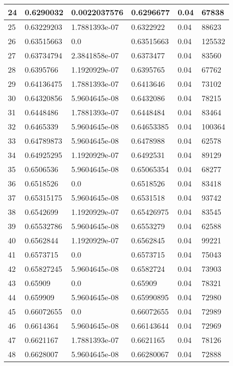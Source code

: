 \begin{longtable}{|l|l|l|l|l|l|}
24 & 0.6290032 & 0.0022037576 & 0.6296677 & 0.04 & 67838 \\ \hline 
25 & 0.63229203 & 1.7881393e-07 & 0.6322922 & 0.04 & 88623 \\ \hline 
26 & 0.63515663 & 0.0 & 0.63515663 & 0.04 & 125532 \\ \hline 
27 & 0.63734794 & 2.3841858e-07 & 0.6373477 & 0.04 & 83560 \\ \hline 
28 & 0.6395766 & 1.1920929e-07 & 0.6395765 & 0.04 & 67762 \\ \hline 
29 & 0.64136475 & 1.7881393e-07 & 0.6413646 & 0.04 & 73102 \\ \hline 
30 & 0.64320856 & 5.9604645e-08 & 0.6432086 & 0.04 & 78215 \\ \hline 
31 & 0.6448486 & 1.7881393e-07 & 0.6448484 & 0.04 & 83464 \\ \hline 
32 & 0.6465339 & 5.9604645e-08 & 0.64653385 & 0.04 & 100364 \\ \hline 
33 & 0.64789873 & 5.9604645e-08 & 0.6478988 & 0.04 & 62578 \\ \hline 
34 & 0.64925295 & 1.1920929e-07 & 0.6492531 & 0.04 & 89129 \\ \hline 
35 & 0.6506536 & 5.9604645e-08 & 0.65065354 & 0.04 & 68277 \\ \hline 
36 & 0.6518526 & 0.0 & 0.6518526 & 0.04 & 83418 \\ \hline 
37 & 0.65315175 & 5.9604645e-08 & 0.6531518 & 0.04 & 93742 \\ \hline 
38 & 0.6542699 & 1.1920929e-07 & 0.65426975 & 0.04 & 83545 \\ \hline 
39 & 0.65532786 & 5.9604645e-08 & 0.6553279 & 0.04 & 62588 \\ \hline 
40 & 0.6562844 & 1.1920929e-07 & 0.6562845 & 0.04 & 99221 \\ \hline 
41 & 0.6573715 & 0.0 & 0.6573715 & 0.04 & 75043 \\ \hline 
42 & 0.65827245 & 5.9604645e-08 & 0.6582724 & 0.04 & 73903 \\ \hline 
43 & 0.65909 & 0.0 & 0.65909 & 0.04 & 78321 \\ \hline 
44 & 0.659909 & 5.9604645e-08 & 0.65990895 & 0.04 & 72980 \\ \hline 
45 & 0.66072655 & 0.0 & 0.66072655 & 0.04 & 72989 \\ \hline 
46 & 0.6614364 & 5.9604645e-08 & 0.66143644 & 0.04 & 72969 \\ \hline 
47 & 0.6621167 & 1.7881393e-07 & 0.6621165 & 0.04 & 78126 \\ \hline 
48 & 0.6628007 & 5.9604645e-08 & 0.66280067 & 0.04 & 72888 \\ \hline 

\end{longtable}

